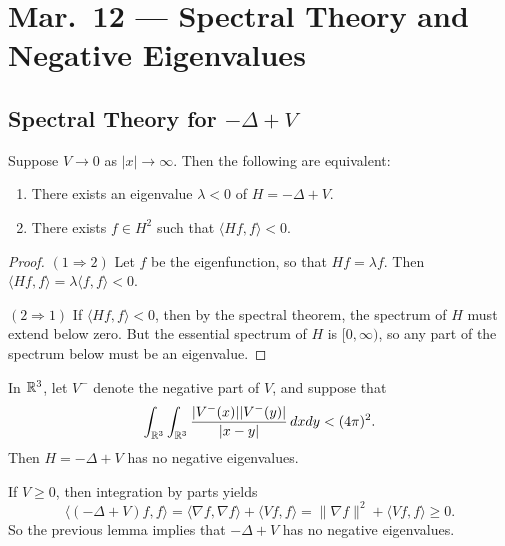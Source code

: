 \chapter{Mar.~12 --- Spectral Theory and Negative Eigenvalues}

\section{Spectral Theory for \texorpdfstring{$-\Delta + V$}{-Delta + V}}
\begin{lemma}
  Suppose $V \to 0$ as $|x| \to \infty$.
  Then the following are equivalent:
  \begin{enumerate}
    \item There exists an eigenvalue $\lambda < 0$
      of $H = -\Delta + V$.
    \item There exists $f \in H^2$
      such that $\langle H f, f \rangle < 0$.
  \end{enumerate}
\end{lemma}

\begin{proof}
  $(1 \Rightarrow 2)$ Let $f$ be the eigenfunction,
  so that $H f = \lambda f$. Then
  $\langle Hf, f \rangle  = \lambda \langle f, f \rangle < 0$.

  $(2 \Rightarrow 1)$
  If $\langle Hf , f \rangle < 0$, then by the
  spectral theorem, the spectrum of $H$ must extend
  below zero. But the essential spectrum of
  $H$ is $[0, \infty)$, so any part of the spectrum below
  must be an eigenvalue.
\end{proof}

\begin{theorem}
  In $\mathbb{R}^3$, let $V^{-}$ denote the negative part
  of $V$, and suppose that
  \[
    \int_{\mathbb{R}^3} \int_{\mathbb{R}^3} \frac{|V^-(x)| |V^-(y)|}{|x - y|} \,dx dy < (4\pi)^2.
  \]
  Then $H = -\Delta + V$ has no negative eigenvalues.
\end{theorem}

\begin{remark}
  If $V \ge 0$, then integration by parts yields
  \[
    \langle (-\Delta + V) f, f \rangle
    = \langle \nabla f, \nabla f \rangle + \langle V f, f \rangle
    = \|\nabla f\|^2 + \langle V f, f \rangle \ge 0.
  \]
  So the previous lemma implies that $-\Delta + V$
  has no negative eigenvalues.
\end{remark}

